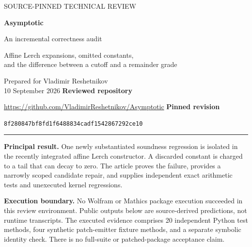\documentclass[11pt,letterpaper]{article}
\newcommand{\pin}{8f280847bf8fd1f6488834cadf1542867292ce10}
\begin{document}
\begin{titlepage}
{\Large\sffamily SOURCE-PINNED TECHNICAL REVIEW\par}
\vspace{0.65in}
{\Huge\bfseries Asymptotic\par}
\vspace{0.18in}
{\LARGE An incremental correctness audit\par}
\vspace{0.28in}
{\Large Affine Lerch expansions, omitted constants,\\and the difference between a cutoff and a remainder grade\par}
\vspace{0.42in}
Prepared for Vladimir Reshetnikov\\10 September 2026
\vfill
\textbf{Reviewed repository}\par
\url{https://github.com/VladimirReshetnikov/Asymptotic}
\textbf{Pinned revision}\par
\texttt{\pin}
\medskip\hrule\medskip
\textbf{Principal result.} One newly substantiated soundness regression is isolated
in the recently integrated affine Lerch constructor. A discarded constant is
charged to a tail that can decay to zero. The article proves the failure,
provides a narrowly scoped candidate repair, and supplies independent exact
arithmetic tests and unexecuted kernel regressions.

\textbf{Execution boundary.} No Wolfram or Mathics package execution succeeded
in this review environment. Public outputs below are source-derived predictions,
not runtime transcripts. The executed evidence comprises 20 independent Python
test methods, four synthetic patch-emitter fixture methods, and a separate
symbolic identity check. There is no full-suite or patched-package acceptance claim.
\end{titlepage}
\end{document}
